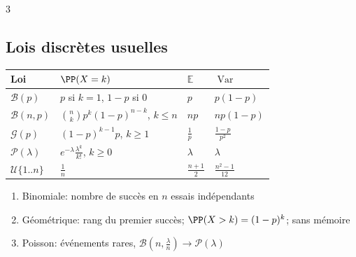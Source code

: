 \documentclass[12pt, a4paper]{article}
\newcommand{\E}{\mathbb{E}}
\newcommand{\Var}{\operatorname{Var}}
\begin{document}
\begin{multicols*}{3}
	\colbreak
	\subsection{Lois discrètes usuelles}
	\begin{tabular}{|l|l|l|l|}
		\hline
		\textbf{Loi}           & $\PP(X=k)$                          & $\E$ & $\Var$ \\
		\hline
		$\mathcal B(p)$        & $p$ si $k=1$, $1-p$ si 0            & $p$  & $p(1-p)$ \\
		$\mathcal B(n,p)$      & $\binom nkp^k(1-p)^{n-k}$, $k\leq n$ & $np$ & $np(1-p)$ \\
		$\mathcal G(p)$        & $(1-p)^{k-1}p$, $k\geq1$            & $\frac1p$ & $\frac{1-p}{p^2}$ \\
		$\mathcal P(\lambda)$  & $e^{-\lambda}\frac{\lambda^k}{k!}$, $k\geq0$ & $\lambda$ & $\lambda$ \\
		$\mathcal U\{1..n\}$   & $\frac1n$                           & $\frac{n+1}2$ & $\frac{n^2-1}{12}$ \\
		\hline
	\end{tabular}
	\begin{enumerate}[\roman*.]
		\item Binomiale: nombre de succès en $n$ essais indépendants
		\item Géométrique: rang du premier succès; $\PP(X>k)=(1-p)^k$; sans mémoire
		\item Poisson: événements rares, $\mathcal B(n,\frac\lambda n)\to\mathcal P(\lambda)$
	\end{enumerate}


\end{multicols*}
\end{document}
